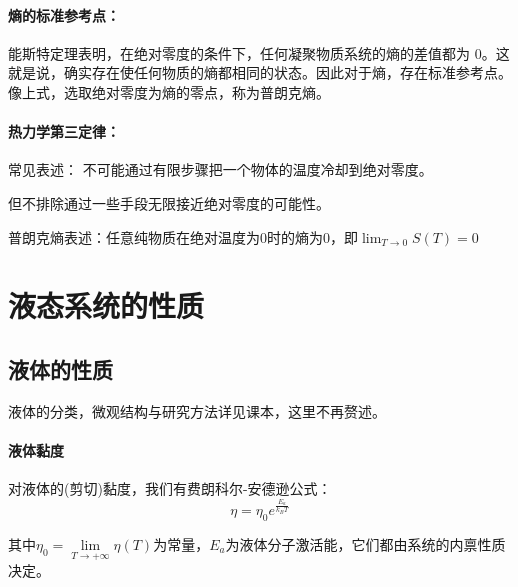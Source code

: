 \documentclass[zihao=-4,UTF8]{report}
\begin{document}
\subsubsection{熵的标准参考点：}

{\par\color{gray}\small
能斯特定理表明，在绝对零度的条件下，任何凝聚物质系统的熵的差值都为 0。这就是说，确实存在使任何物质的熵都相同的状态。因此对于熵，存在标准参考点。像上式，选取绝对零度为熵的零点，称为普朗克熵。
\par}
\subsubsection{热力学第三定律：}
 常见表述：
不可能通过有限步骤把一个物体的温度冷却到绝对零度。
{\par\color{gray}\small
但不排除通过一些手段无限接近绝对零度的可能性。
\par}
 普朗克熵表述：任意纯物质在绝对温度为0时的熵为0，即$\lim_{T\rightarrow 0} S(T) = 0$\par

\chapter{液态系统的性质}
\section{液体的性质}
液体的分类，微观结构与研究方法详见课本，这里不再赘述。
\subsubsection{液体黏度}
对液体的(剪切)黏度，我们有费朗科尔-安德逊公式：
\begin{equation}
\eta = \eta_0e^{\frac{E_a}{k_BT}}
\end{equation}
{\par\color{gray}\small
其中$\eta_0 = \underset{{T\rightarrow+\infty}}{\lim} \eta(T)$为常量，$E_a$为液体分子激活能，它们都由系统的内禀性质决定。
\par}
\end{document}
